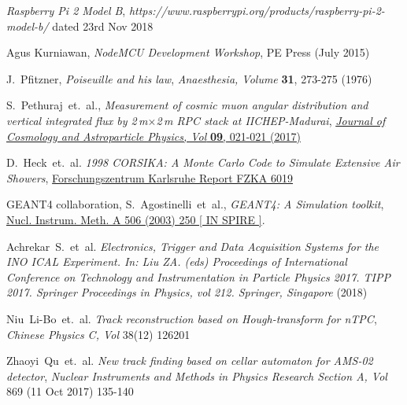 \documentclass[a4paper,12pt,twoside,openany]{article}
\begin{document}
\begin{thebibliography}{9}
  \emph{Raspberry Pi 2 Model B}, \emph{https://www.raspberrypi.org/products/raspberry-pi-2-model-b/} dated 23rd Nov 2018
    
  Agus Kurniawan, \emph{NodeMCU Development Workshop}, PE Press (July 2015)

  J.~Pfitzner, \emph{Poiseuille and his law}, \emph{Anaesthesia, Volume } \textbf{31}, 273-275 (1976)
  
  
  S.~Pethuraj~et.~al., \emph{Measurement of cosmic muon angular distribution and vertical integrated flux by 2\,m$\times$2\,m {RPC} stack at {IICHEP}-Madurai}, \href{https://doi.org/10.1088/1475-7516/2017/09/021}{\emph{Journal of Cosmology and Astroparticle Physics, Vol} \textbf{09}, 021-021 (2017)}
  
  D.~Heck~et.~al. \emph{1998 CORSIKA: A Monte Carlo Code to Simulate Extensive Air Showers}, \href{https://www.ikp.kit.edu/corsika/70.php}{Forschungszentrum Karlsruhe Report FZKA 6019}
    
  GEANT4 collaboration, S.~Agostinelli~et~al., \textit{GEANT4: A Simulation toolkit}, \href{https://doi.org/10.1016/j.nima.2010.08.075}{Nucl. Instrum.  Meth. A 506 (2003) 250 [ IN SPIRE ]}.
  


  Achrekar~S.~et~al. \emph{Electronics, Trigger and Data Acquisition Systems for the INO ICAL Experiment. In: Liu ZA. (eds) Proceedings of International Conference on Technology and Instrumentation in Particle Physics 2017. TIPP 2017. Springer Proceedings in Physics, vol 212. Springer, Singapore} (2018)

  Niu~Li-Bo~et.~al. \emph{Track reconstruction based on Hough-transform for nTPC}, \emph{Chinese Physics C, Vol} 38(12) 126201
  
  Zhaoyi~Qu~et.~al. \emph{New track finding based on cellar automaton for AMS-02 detector}, \emph{Nuclear Instruments and Methods in Physics Research Section A, Vol} 869 (11 Oct 2017) 135-140
  

\end{thebibliography}
\end{document}
